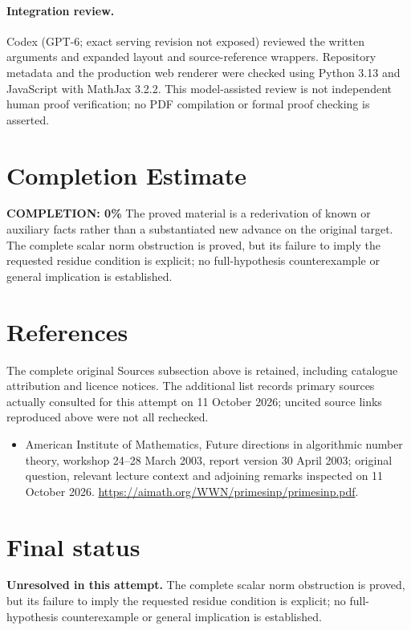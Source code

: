 \documentclass[11pt]{article}
\begin{document}
\paragraph{Integration review.} Codex (GPT-6; exact serving revision not exposed) reviewed the written arguments and expanded layout and source-reference wrappers. Repository metadata and the production web renderer were checked using Python 3.13 and JavaScript with MathJax 3.2.2. This model-assisted review is not independent human proof verification; no PDF compilation or formal proof checking is asserted.

\section{Completion Estimate}
\noindent\textbf{COMPLETION: 0\%}
The proved material is a rederivation of known or auxiliary facts rather than a substantiated new advance on the original target. The complete scalar norm obstruction is proved, but its failure to imply the requested residue condition is explicit; no full-hypothesis counterexample or general implication is established.
\section{References}
The complete original Sources subsection above is retained, including catalogue attribution and licence notices. The additional list records primary sources actually consulted for this attempt on 11 October 2026; uncited source links reproduced above were not all rechecked.
\begin{itemize}
\item American Institute of Mathematics, Future directions in algorithmic number theory, workshop 24--28 March 2003, report version 30 April 2003; original question, relevant lecture context and adjoining remarks inspected on 11 October 2026. \url{https://aimath.org/WWN/primesinp/primesinp.pdf}.
\end{itemize}
\section{Final status}
\textbf{Unresolved in this attempt.} The complete scalar norm obstruction is proved, but its failure to imply the requested residue condition is explicit; no full-hypothesis counterexample or general implication is established.
\end{document}
